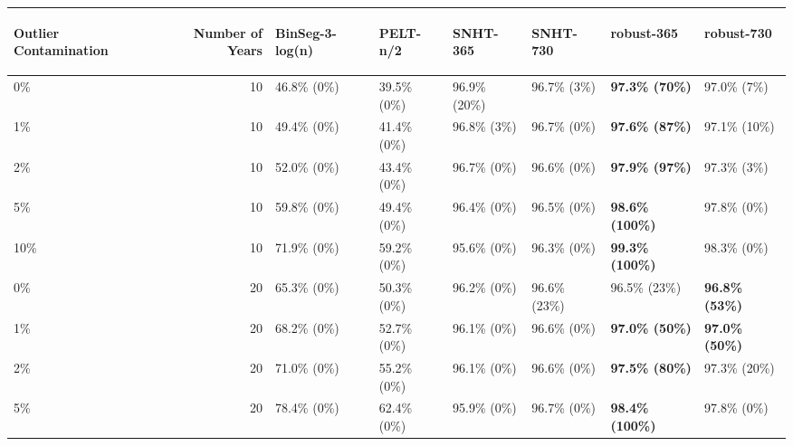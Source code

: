 \documentclass[12pt]{article}
\begin{document}
\begin{table}[ht]
\centering
\begin{tabular}{lrllllll}
  \hline
\begin{sideways} Outlier Contamination \end{sideways} & \begin{sideways} Number of Years \end{sideways} & \begin{sideways} BinSeg-3-log(n) \end{sideways} & \begin{sideways} PELT-n/2 \end{sideways} & \begin{sideways} SNHT-365 \end{sideways} & \begin{sideways} SNHT-730 \end{sideways} & \begin{sideways} robust-365 \end{sideways} & \begin{sideways} robust-730 \end{sideways} \\ 
  \hline
0\% &  10 & 46.8\% (0\%) & 39.5\% (0\%) & 96.9\% (20\%) & 96.7\% (3\%) & \textbf{97.3\% (70\%)} & 97.0\% (7\%) \\ 
  1\% &  10 & 49.4\% (0\%) & 41.4\% (0\%) & 96.8\% (3\%) & 96.7\% (0\%) & \textbf{97.6\% (87\%)} & 97.1\% (10\%) \\ 
  2\% &  10 & 52.0\% (0\%) & 43.4\% (0\%) & 96.7\% (0\%) & 96.6\% (0\%) & \textbf{97.9\% (97\%)} & 97.3\% (3\%) \\ 
  5\% &  10 & 59.8\% (0\%) & 49.4\% (0\%) & 96.4\% (0\%) & 96.5\% (0\%) & \textbf{98.6\% (100\%)} & 97.8\% (0\%) \\ 
  10\% &  10 & 71.9\% (0\%) & 59.2\% (0\%) & 95.6\% (0\%) & 96.3\% (0\%) & \textbf{99.3\% (100\%)} & 98.3\% (0\%) \\ 
  0\% &  20 & 65.3\% (0\%) & 50.3\% (0\%) & 96.2\% (0\%) & 96.6\% (23\%) & 96.5\% (23\%) & \textbf{96.8\% (53\%)} \\ 
  1\% &  20 & 68.2\% (0\%) & 52.7\% (0\%) & 96.1\% (0\%) & 96.6\% (0\%) & \textbf{97.0\% (50\%)} & \textbf{97.0\% (50\%)} \\ 
  2\% &  20 & 71.0\% (0\%) & 55.2\% (0\%) & 96.1\% (0\%) & 96.6\% (0\%) & \textbf{97.5\% (80\%)} & 97.3\% (20\%) \\ 
  5\% &  20 & 78.4\% (0\%) & 62.4\% (0\%) & 95.9\% (0\%) & 96.7\% (0\%) & \textbf{98.4\% (100\%)} & 97.8\% (0\%) \\ 

\end{tabular}
\end{table}
\end{document}
